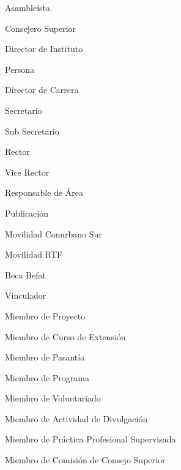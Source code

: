 \item Asambleísta
\item Consejero Superior
\item Director de Instituto
\item Persona
\item Director de Carrera
\item Secretario
\item Sub Secretario
\item Rector
\item Vice Rector
\item Responsable de Área
\item Publicación
\item Movilidad Conurbano Sur
\item Movilidad RTF
\item Beca Befat
\item Vinculador
\item Miembro de Proyecto
\item Miembro de Curso de Extensión
\item Miembro de Pasantía
\item Miembro de Programa
\item Miembro de Voluntariado
\item Miembro de Actividad de Divulgación
\item Miembro de Práctica Profesional Supervisada
\item Miembro de Comisión de Consejo Superior

